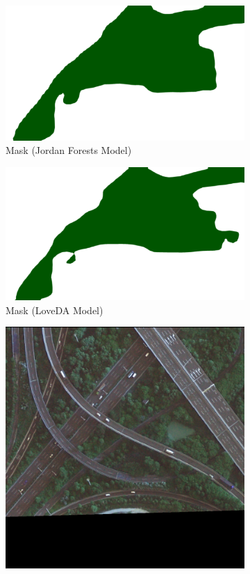 \begin{figure}[H]
\begin{subfigure}{0.32\textwidth}
    \centering
    \includegraphics[width=\textwidth]{IMAGENES/Result_Mask2_J.png}
    \caption{Mask (Jordan Forests Model)}
    \label{fig:img2}
\end{subfigure}
\hfill
\begin{subfigure}{0.32\textwidth}
    \centering
    \includegraphics[width=\textwidth]{IMAGENES/Result_Mask2_Lo.png}
    \caption{Mask (LoveDA Model)}
    \label{fig:img3}
\end{subfigure}
\begin{subfigure}{0.32\textwidth}
    \centering
    \includegraphics[width=\textwidth]{IMAGENES/Result_Img3.png}

\end{subfigure}
\end{figure}
